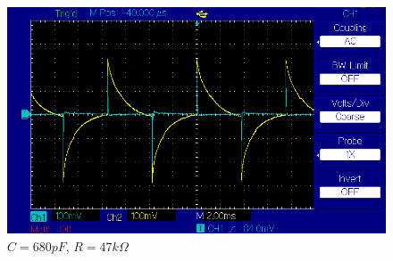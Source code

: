 \documentclass{article}
\begin{document}
\begin{figure}[!h]
        \caption{$C = 330 pF$, $R = 47 k\Omega$}
        \label{img:c33e1_r47}
    \endminipage\hfill
        \centering
        \includegraphics[width=\linewidth]{figures/results/resistor_47_Ohm/c680pF.png}
        \caption{$C = 680 pF$, $R = 47 k\Omega$}
        \label{img:c68e1_r47}
    \endminipage\hfill
\end{figure}
\end{document}
